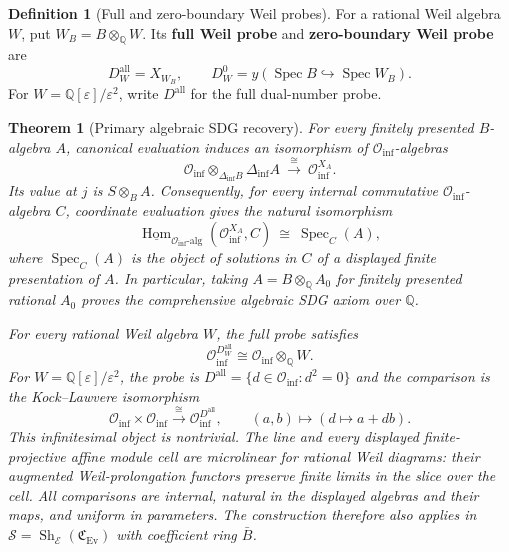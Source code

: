 \documentclass[11pt,a4paper]{article}
\numberwithin{algorithm}{section}
\numberwithin{equation}{section}
\newtheorem{theorem}{Theorem}[section]
\theoremstyle{definition}
\newtheorem{definition}[definition]{Definition}
\theoremstyle{remark}
\theoremstyle{plain}
\newcommand{\E}{\mathcal E}
\newcommand{\QQ}{\mathbb Q}
\newcommand{\eps}{\varepsilon}
\newcommand{\Hom}{\operatorname{Hom}}
\newcommand{\Ev}{{\operatorname{Ev}}}
\newcommand{\Cplx}{\mathfrak C_{\Ev}}
\newcommand{\Sh}{\operatorname{Sh}}
\theoremstyle{definition}
\theoremstyle{plain}
\begin{document}
\begin{definition}[Full and zero-boundary Weil probes]\label{def:primary-weil-probes}
For a rational Weil algebra $W$, put $W_B=B\otimes_\QQ W$.
Its \textbf{full Weil probe} and \textbf{zero-boundary Weil probe} are
\[
 D_W^{\mathrm{all}}=X_{W_B},\qquad
 D_W^0=y(\operatorname{Spec}B\hookrightarrow\operatorname{Spec}W_B).
\]
For $W=\QQ[\eps]/\eps^2$, write $D^{\mathrm{all}}$ for the
full dual-number probe.
\end{definition}

\begin{theorem}[Primary algebraic SDG recovery]
\label{thm:primary-sdg}\label{thm:primary-affine-duality}
For every finitely presented $B$-algebra $A$, canonical evaluation
induces an isomorphism of $\mathcal O_{\mathrm{inf}}$-algebras
\begin{equation}\label{eq:primary-affine-duality}
 \mathcal O_{\mathrm{inf}}
   \otimes_{\Delta_{\mathrm{inf}}B}\Delta_{\mathrm{inf}}A
 \ \xrightarrow{\ \cong\ }\
 \mathcal O_{\mathrm{inf}}^{X_A}.
\end{equation}
Its value at $j$ is $S\otimes_BA$.  Consequently, for every internal
commutative $\mathcal O_{\mathrm{inf}}$-algebra $C$, coordinate
evaluation gives the natural isomorphism
\begin{equation}\label{eq:primary-comprehensive-sdg}
 \underline{\Hom}_{\mathcal O_{\mathrm{inf}}\text{-alg}}
       (\mathcal O_{\mathrm{inf}}^{X_A},C)
 \ \cong\ \operatorname{Spec}_C(A),
\end{equation}
where $\operatorname{Spec}_C(A)$ is the object of solutions in $C$
of a displayed finite presentation of $A$.  In particular, taking
$A=B\otimes_\QQ A_0$ for finitely presented rational $A_0$ proves
the comprehensive algebraic SDG axiom over $\QQ$.

For every rational Weil algebra $W$, the full probe satisfies
\begin{equation}\label{eq:primary-weil-kl}
 \mathcal O_{\mathrm{inf}}^{D_W^{\mathrm{all}}}
 \cong\mathcal O_{\mathrm{inf}}\otimes_\QQ W.
\end{equation}
For $W=\QQ[\eps]/\eps^2$, the probe is
$D^{\mathrm{all}}=\{d\in\mathcal O_{\mathrm{inf}}:d^2=0\}$ and
the comparison is the Kock--Lawvere isomorphism
\begin{equation}\label{eq:primary-dual-number-kl}
 \mathcal O_{\mathrm{inf}}\times\mathcal O_{\mathrm{inf}}
 \xrightarrow{\ \cong\ }\mathcal O_{\mathrm{inf}}^{D^{\mathrm{all}}},
 \qquad(a,b)\longmapsto(d\mapsto a+db).
\end{equation}
This infinitesimal object is nontrivial.  The line and every displayed
finite-projective affine module cell are microlinear for rational Weil
diagrams: their augmented Weil-prolongation functors preserve finite
limits in the slice over the cell.  All comparisons are internal,
natural in the displayed algebras and their maps, and uniform in
parameters.  The construction therefore also applies in
$\mathscr S=\Sh_\E(\Cplx)$ with coefficient ring $\bar B$.
\end{theorem}
\end{document}
